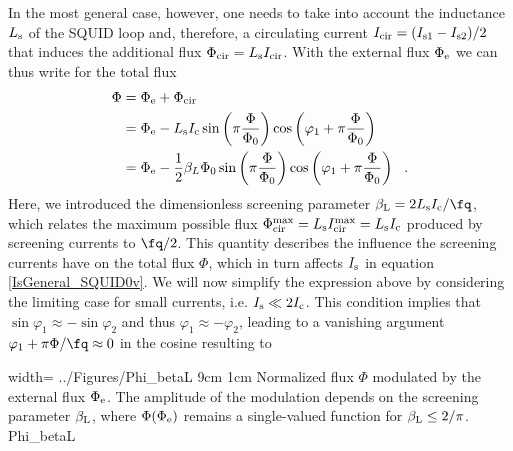 In the most general case, however, one needs to take into account the inductance $L_{\rm s}$ of the SQUID loop and, therefore, a circulating current $I_{\rm cir} = ({I_{\rm s1} - I_{\rm s2}})/{2}$ that induces the additional flux $\Phi_{\rm cir} = L_{\rm s}I_{\rm cir}$. With the external flux $\Phi_{\rm e}$ we can thus write for the total flux
\begin{align}
	\Phi &= \Phi_{\rm e} + \Phi_{\rm cir} \\ &= \Phi_{\rm e} - L_{\rm s} I_{\rm  c} \sin \left(\pi \frac{\Phi}{\Phi_0}\right) \cos \left(\varphi_1+\pi \frac{\Phi}{\Phi_0}\right) \\ &= \Phi_{\mathrm{e}}-\frac{1}{2} \beta_L \Phi_0 \sin \left(\pi \frac{\Phi}{\Phi_0}\right) \cos \left(\varphi_1+\pi \frac{\Phi}{\Phi_0}\right) \ \ .
\end{align}
Here, we introduced the dimensionless screening parameter $\beta_{\rm L}=2L_{\rm s}I_{\rm c}/\unit{\fq}$, which relates the maximum possible flux $\Phi_{\rm cir}^{\rm max} = L_{\rm s}I_{\rm cir}^{\rm max} = L_{\rm s}I_{\rm c}$ produced by screening currents to ${\unit{\fq}}/{2}$. This quantity describes the influence the screening currents have on the total flux $\Phi$, which in turn affects $I_{\rm s}$ in equation \ref{IsGeneral_SQUID0v}. We will now simplify the expression above by considering the limiting case for small currents, i.e. $I_{\rm s}\ll 2I_{\rm c}$. This condition implies that $\sin\varphi_1\approx -  \sin\varphi_2$ and thus $\varphi_1\approx - \varphi_2$, leading to a vanishing argument $\varphi_1 + \pi\Phi/\unit{\fq} \approx 0$ in the cosine resulting to



{width=\textwidth}
{../Figures/Phi_betaL}
{9cm}
{1cm}
{Normalized flux $\Phi$ modulated by the external flux $\Phi_{\rm e}$. The amplitude of the modulation depends on the screening parameter $\beta_{\rm L}$, where $\Phi(\Phi_{\rm e})$ remains a single-valued function for $\beta_{\rm L}\leq2/\pi$.} 
{Phi_betaL}

